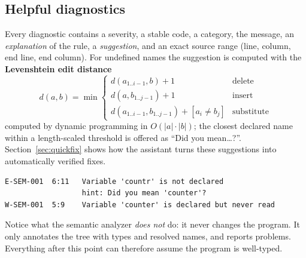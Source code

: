 \subsection{Helpful diagnostics}
Every diagnostic contains a severity, a stable code, a category, the message, an \emph{explanation} of the rule, a \emph{suggestion}, and an exact source range (line, column, end line, end column). For undefined names the suggestion is computed with the \textbf{Levenshtein edit distance}
\[ d(a,b)=\min \begin{cases} d(a_{1..i-1},b)+1 & \text{delete}\\ d(a,b_{1..j-1})+1 & \text{insert}\\ d(a_{1..i-1},b_{1..j-1})+[a_i\ne b_j] & \text{substitute}\end{cases} \]
computed by dynamic programming in $O(|a|\cdot|b|)$; the closest declared name within a length-scaled threshold is offered as ``Did you mean\ldots?''. Section~\ref{sec:quickfix} shows how the assistant turns these suggestions into automatically verified fixes.

\begin{lstlisting}[caption={Compiler output for the shipped example \texttt{e01\_undefined\_variable}.},label={lst:e01},style=tiny]
E-SEM-001  6:11   Variable 'countr' is not declared
                  hint: Did you mean 'counter'?
W-SEM-001  5:9    Variable 'counter' is declared but never read
\end{lstlisting}

\begin{plain}
Notice what the semantic analyzer \emph{does not} do: it never changes the program. It only annotates the tree with types and resolved names, and reports problems. Everything after this point can therefore assume the program is well-typed.
\end{plain}

